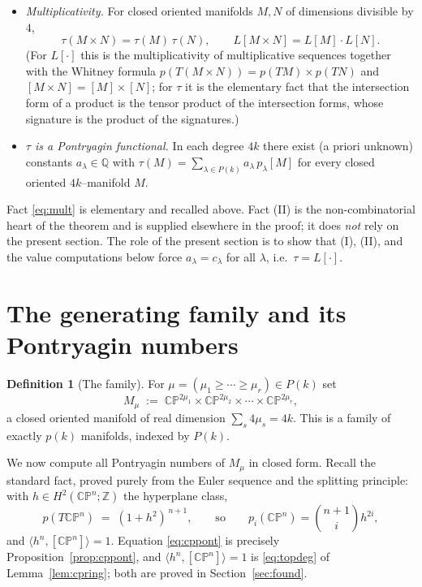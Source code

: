 \documentclass[12pt]{article}
\theoremstyle{definition}
\newtheorem{definition}{Definition}
\begin{document}
\begin{itemize}
\item[\textbf{(I)}] \emph{Multiplicativity.} For closed oriented manifolds $M,N$ of
dimensions divisible by $4$,
\[
\tau(M\times N)=\tau(M)\,\tau(N),\qquad L[M\times N]=L[M]\cdot L[N].
\tag{2}\label{eq:mult}
\]
(For $L[\cdot]$ this is the multiplicativity of multiplicative sequences together with
the Whitney formula $p(T(M\times N))=p(TM)\times p(TN)$ and
$[M\times N]=[M]\times[N]$; for $\tau$ it is the elementary fact that the intersection
form of a product is the tensor product of the intersection forms, whose signature is
the product of the signatures.)
\item[\textbf{(II)}] \emph{$\tau$ is a Pontryagin functional.} In each degree $4k$ there
exist (a priori unknown) constants $a_\lambda\in\mathbb{Q}$ with
$\tau(M)=\sum_{\lambda\in P(k)}a_\lambda\, p_\lambda[M]$ for every closed oriented
$4k$--manifold $M$.
\end{itemize}

\noindent
Fact \eqref{eq:mult} is elementary and recalled above.  Fact (II) is the
non-combinatorial heart of the theorem and is supplied elsewhere in the proof; it does
\emph{not} rely on the present section.  The role of the present section is to show that
(I), (II), and the value computations below force $a_\lambda=c_\lambda$ for all
$\lambda$, i.e.\ $\tau=L[\cdot]$.

\bigskip

\section{The generating family and its Pontryagin numbers}

\begin{definition}[The family]\label{def:family}
For $\mu=(\mu_1\ge\cdots\ge\mu_r)\in P(k)$ set
\[
M_\mu\;:=\;\mathbb{CP}^{2\mu_1}\times\mathbb{CP}^{2\mu_2}\times\cdots\times
\mathbb{CP}^{2\mu_r},
\]
a closed oriented manifold of real dimension $\sum_s 4\mu_s=4k$.  This is a family of
exactly $p(k)$ manifolds, indexed by $P(k)$.
\end{definition}

We now compute all Pontryagin numbers of $M_\mu$ in closed form.  Recall the standard
fact, proved purely from the Euler sequence and the splitting principle: with
$h\in H^2(\mathbb{CP}^n;\mathbb{Z})$ the hyperplane class,
\[
p(T\mathbb{CP}^n)\;=\;(1+h^2)^{\,n+1},
\qquad\text{so}\qquad
p_i(\mathbb{CP}^n)=\binom{n+1}{i}h^{2i},
\tag{3}\label{eq:cppont}
\]
and $\langle h^n,[\mathbb{CP}^n]\rangle=1$.  Equation \eqref{eq:cppont} is precisely
Proposition~\ref{prop:cppont}, and $\langle h^n,[\mathbb{CP}^n]\rangle=1$ is
\eqref{eq:topdeg} of Lemma~\ref{lem:cpring}; both are proved in
Section~\ref{sec:found}.
\end{document}
